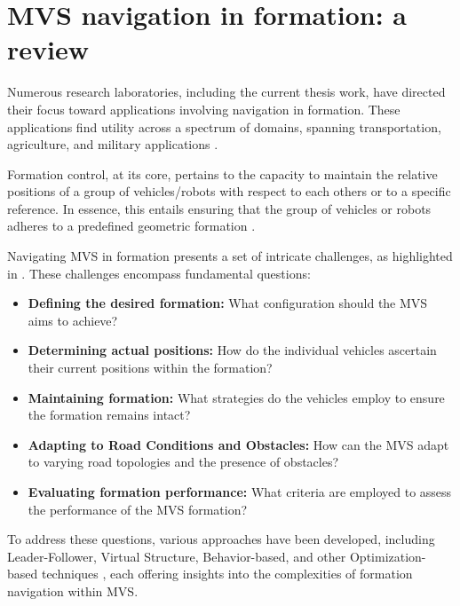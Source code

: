 \section{MVS navigation in formation: a review} \label{sec: formation_control_theory}






Numerous research laboratories, including the current thesis work, have directed their focus toward applications involving navigation in formation. These applications find utility across a spectrum of domains, spanning transportation, agriculture, and military applications \cite{ventura2015safe}\cite{wolterink2011automated}\cite{meyer2014research}. 

Formation control, at its core, pertains to the capacity to maintain the relative positions of a group of vehicles/robots with respect to each others or to a specific reference. In essence, this entails ensuring that the group of vehicles or robots adheres to a predefined geometric formation \cite{adouane2016autonomous}.

Navigating MVS in formation presents a set of intricate challenges, as highlighted in \cite{ventura2015safe}. These challenges encompass fundamental questions: 

\begin{itemize}
    \item \textbf{Defining the desired formation:} What configuration should the MVS aims to achieve? 
    \item \textbf{Determining actual positions:} How do the individual vehicles ascertain their current positions within the formation? 
    \item \textbf{Maintaining formation:} What strategies do the vehicles employ to ensure the formation remains intact? 
    \item \textbf{Adapting to Road Conditions and Obstacles:} How can the MVS adapt to varying road topologies and the presence of obstacles? 
    \item \textbf{Evaluating formation performance:} What criteria are employed to assess the performance of the MVS formation? 
\end{itemize}

To address these questions, various approaches have been developed, including Leader-Follower, Virtual Structure, Behavior-based, and other Optimization-based techniques \cite{chen2005formation}\cite{murray2007recent}, each offering insights into the complexities of formation navigation within MVS.

